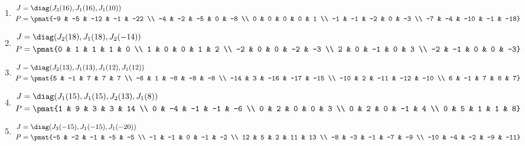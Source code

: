 \begin{enumerate}
\item

\begin{align*}
J &= \diag(J_{3}(16), J_{1}(16), J_{1}(10))\\
P &= \pmat{-9 & -5 & -12 & -1 & -22 \\ -4 & -2 & -5 & 0 & -8 \\ 0 & 0 & 0 & 0 & 1 \\ -1 & -1 & -2 & 0 & -3 \\ -7 & -4 & -10 & -1 & -18}
\end{align*}

\item

\begin{align*}
J &= \diag(J_{2}(18), J_{1}(18), J_{2}(-14))\\
P &= \pmat{0 & 1 & 1 & 1 & 0 \\ 1 & 0 & 0 & 1 & 2 \\ -2 & 0 & 0 & -2 & -3 \\ 2 & 0 & -1 & 0 & 3 \\ -2 & -1 & 0 & 0 & -3}
\end{align*}

\item

\begin{align*}
J &= \diag(J_{2}(13), J_{1}(13), J_{1}(12), J_{1}(12))\\
P &= \pmat{5 & -1 & 7 & 7 & 7 \\ -6 & 1 & -8 & -8 & -8 \\ -14 & 3 & -16 & -17 & -15 \\ -10 & 2 & -11 & -12 & -10 \\ 6 & -1 & 7 & 8 & 7}
\end{align*}

\item

\begin{align*}
J &= \diag(J_{1}(15), J_{1}(15), J_{2}(13), J_{1}(8))\\
P &= \pmat{1 & 9 & 3 & 3 & 14 \\ 0 & -4 & -1 & -1 & -6 \\ 0 & 2 & 0 & 0 & 3 \\ 0 & 2 & 0 & -1 & 4 \\ 0 & 5 & 1 & 1 & 8}
\end{align*}

\item

\begin{align*}
J &= \diag(J_{3}(-15), J_{1}(-15), J_{1}(-20))\\
P &= \pmat{-5 & -2 & -1 & -5 & -5 \\ -1 & -1 & 0 & -1 & -2 \\ 12 & 5 & 2 & 11 & 13 \\ -8 & -3 & -1 & -7 & -9 \\ -10 & -4 & -2 & -9 & -11}
\end{align*}


\end{enumerate}
